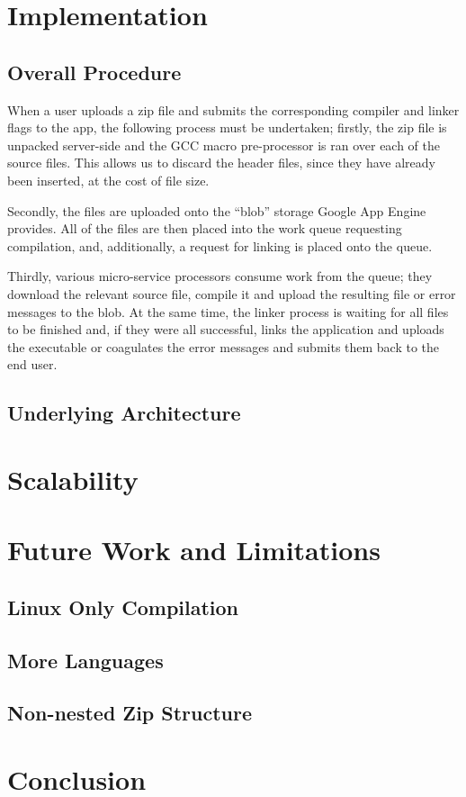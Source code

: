 \documentclass[conference]{IEEEtran}
\begin{document}

\section{Implementation}
\subsection{Overall Procedure}
When a user uploads a zip file and submits the corresponding compiler and linker
flags to the app, the following process must be undertaken; firstly, the zip
file is unpacked server-side and the GCC macro pre-processor is ran over each of
the source files. This allows us to discard the header files, since they have
already been inserted, at the cost of file size. 

Secondly, the files are uploaded onto the ``blob'' storage Google App Engine
provides. All of the files are then placed into the work queue requesting
compilation, and, additionally, a request for linking is placed onto the queue.

Thirdly, various micro-service processors consume work from the queue; they
download the relevant source file, compile it and upload the resulting file or
error messages to the blob. At the same time, the linker process is waiting for
all files to be finished and, if they were all successful, links the
application and uploads the executable or coagulates the error messages and
submits them back to the end user.
\subsection{Underlying Architecture}
\section{Scalability}
\section{Future Work and Limitations}
\subsection{Linux Only Compilation}
\subsection{More Languages}
\subsection{Non-nested Zip Structure}
\section{Conclusion}

\end{document}
